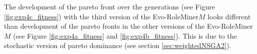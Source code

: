 The development of the pareto front over the generations (see Figure \ref{fig:exp4c_fitness}) with the third version of the Evo-RoleMiner$M$ looks different than development of the pareto fronts in the other versions of the Evo-RoleMiner$M$ (see Figure \ref{fig:exp4a_fitness} and \ref{fig:exp4b_fitness}). This is due to the stochastic version of pareto dominance (see section \ref{sec:weightedNSGA2}).